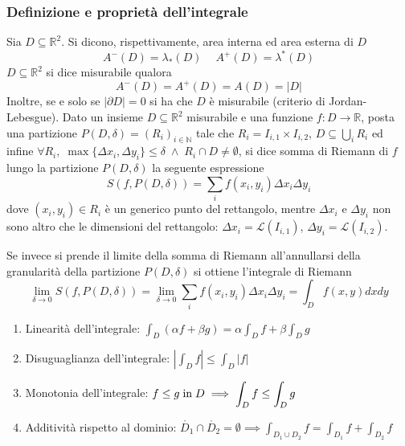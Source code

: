         \subsubsection{Definizione e proprietà dell'integrale}
        Sia $D \subseteq \mathbb{R}^{2}$. Si dicono, rispettivamente, area interna ed area esterna di $D$
        \[
            A^{-}(D) = \lambda_{*}(D) \quad \: A^{+}(D) = \lambda^{*}(D)
        \]
        $D \subseteq \mathbb{R}^{2}$ si dice misurabile qualora
        \[
            A^{-}(D) = A^{+}(D) = A(D) = |D|
        \]
        Inoltre, se e solo se $|\partial D| = 0$ si ha che $D$ è misurabile (criterio di Jordan-Lebesgue). 
        Dato un insieme $D \subseteq \mathbb{R}^{2}$ misurabile e una funzione $f: D \rightarrow \mathbb{R}$, posta una partizione $P(D, \delta) = (R_{i})_{i \in \mathbb{N}}$ tale che $R_{i} = I_{i, 1} \times I_{i, 2}$, $\displaystyle D \subseteq \bigcup_{i} R_{i}$ ed infine $\forall R_{i}, \; \max\{\Delta x_{i}, \Delta y_{i}\} \leq \delta \; \land \; R_{i} \cap D \neq \emptyset$,
        si dice somma di Riemann di $f$ lungo la partizione $P(D, \delta)$ la seguente espressione
        \[
            S(f, P(D, \delta)) = \sum_{i} f(x_i, y_i) \Delta x_i \Delta y_i
        \]
        dove $(x_i, y_i) \in R_{i}$ è un generico punto del rettangolo, mentre $\Delta x_i$ e $\Delta y_i$ non sono altro che le dimensioni del rettangolo: $\Delta x_i = \mathcal{L}(I_{i, 1})$, $\Delta y_i = \mathcal{L}(I_{i, 2})$.

        Se invece si prende il limite della somma di Riemann all'annullarsi della granularità della partizione $P(D, \delta)$ si ottiene l'integrale di Riemann
        \[
            \lim_{\delta \rightarrow 0} S(f, P(D, \delta)) = \lim_{\delta \rightarrow 0} \sum_{i}f(x_i, y_i) \Delta x_i \Delta y_i = \int_{D} f(x, y) dx dy
        \]

        \begin{enumerate}[label=(\arabic*)]
            \item Linearità dell'integrale: $\displaystyle \int_{D} (\alpha f + \beta g) = \alpha \int_{D} f + \beta \int_{D} g$
            \item Disuguaglianza dell'integrale: $\displaystyle \left| \int_{D} f \right| \leq \int_{D} |f| $
            \item Monotonia dell'integrale: $\displaystyle f \leq g \; \textnormal{in} \; D \implies \int_{D} f \leq \int_{D} g$
            \item Additività rispetto al dominio: $\displaystyle \mathring{D_1} \cap \mathring{D_2} = \emptyset \implies \int_{D_1 \cup D_2} f = \int_{D_1} f + \int_{D_2} f$
        \end{enumerate}


